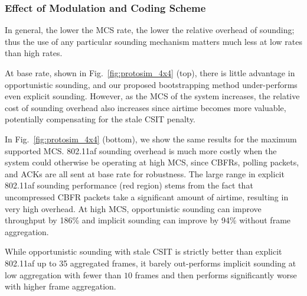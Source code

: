 
	
\subsubsection{Effect of Modulation and Coding Scheme}
 In general, the lower the \ac{MCS} rate, the lower the relative overhead of sounding; thus the use of any particular sounding mechanism matters much less at low rates than high rates.
	
	At base rate, shown in Fig.~\ref{fig:protosim_4x4} (top), there is little advantage in opportunistic sounding, and our proposed bootstrapping method under-performs even explicit sounding.
	However, as the \ac{MCS} of the system increases, the relative cost of sounding overhead also increases since airtime becomes more valuable, potentially compensating for the stale \ac{CSIT} penalty.
	
	In Fig.~\ref{fig:protosim_4x4} (bottom), we show the same results for the maximum supported \ac{MCS}.
	802.11af sounding overhead is much more costly when the system could otherwise be operating at high \ac{MCS}, since \acp{CBFR}, polling packets, and \acp{ACK} are all sent at base rate for robustness.
	The large range in explicit 802.11af sounding performance (red region) stems from the fact that uncompressed \ac{CBFR} packets take a significant amount of airtime, resulting in very high overhead.
	At high \ac{MCS}, opportunistic sounding can improve throughput by 186\% and implicit sounding can improve by 94\% without frame aggregation.
	
	While opportunistic sounding with stale \ac{CSIT} is strictly better than explicit 802.11af up to 35 aggregated frames, it barely out-performs implicit sounding at low aggregation with fewer than $10$ frames and then performs significantly worse with higher frame aggregation.


